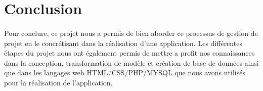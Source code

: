 \documentclass[a4paper, 12pt]{article}
\begin{document}
\newpage

\section{Conclusion}
\paragraph{}Pour conclure, ce projet nous a permis de bien aborder ce processus de gestion de projet en le concrétisant dans la réalisation d'une application. Les différentes étapes du projet nous ont également permis de mettre a profit nos connaissances dans la conception, transformation de modèle et création de base de données ainsi que dans les langages web HTML/CSS/PHP/MYSQL que nous avons utilisés pour la réalisation de l'application.
\end{document}
